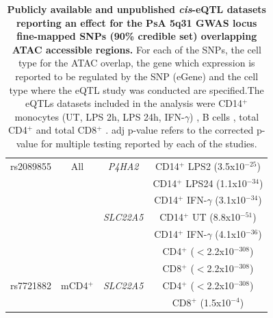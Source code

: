 \begin{table}[htbp]
\begin{tabular}{@{} c c c c}
\midrule
rs2089855    & All                       & \textit{P4HA2}   & CD14$^+$ LPS2 (3.5x10$^{-25}$)\\
             &                           &                  & CD14$^+$ LPS24 (1.1x10$^{-34}$) \\
						 &                           &                  & CD14$^+$ IFN-$\gamma$ (3.1x10$^{-34}$) \\
             &                           & \textit{SLC22A5} & CD14$^+$ UT (8.8x10$^{-51}$) \\
						 &                           &                  & CD14$^+$ IFN-$\gamma$ (4.1x10$^{-36}$)\\
						 &                           &                  & CD4$^+$ ($<$2.2x10$^{-308}$) \\
						 &                           &                  & CD8$^+$ ($<$2.2x10$^{-308}$)  \\
\midrule
rs7721882    & mCD4$^+$                  & \textit{SLC22A5} & CD4$^+$ ($<$2.2x10$^{-308}$) \\
             &                           &                  & CD8$^+$ (1.5x10$^{-4}$) \\							
\bottomrule
\end{tabular}
\medskip %
\caption[Publicly available \textit{cis}-eQTL datasets reporting an effect for the PsA 5q31 GWAS locus fine-mapped SNPs (90\% credible set) overlapping ATAC accessible regions.]{\textbf{Publicly available and unpublished \textit{cis}-eQTL datasets reporting an effect for the PsA 5q31 GWAS locus fine-mapped SNPs (90\% credible set) overlapping ATAC accessible regions.} For each of the SNPs, the cell type for the ATAC overlap, the gene which expression is reported to be regulated by the SNP (eGene) and the cell type where the eQTL study was conducted are specified.The eQTLs datasets included in the analysis were CD14$^+$ monocytes (UT, LPS 2h, LPS 24h, IFN-$\gamma$) \parencite{Fairfax2014}, B cells \parencite{Fairfax2012}, total CD4$^+$ and total CD8$^+$ \parencite{Kasela2017}. adj p-value refers to the corrected p-value for multiple testing reported by each of the studies.} %
\label{tab:5q31_SNPs_ATAC_eQTL}
\end{table}


